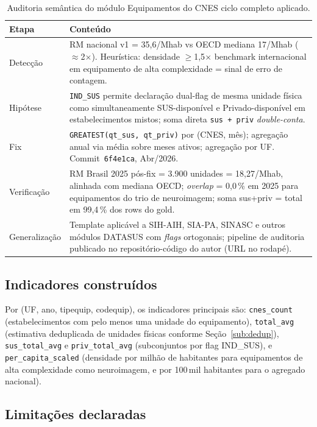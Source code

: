 \documentclass[12pt,a4paper,oneside]{article}
\begin{document}
\begin{table}[htbp]
\centering
\caption{Auditoria semântica do módulo Equipamentos do CNES \textemdash{}
ciclo completo aplicado.}
\label{tab:audit-summary}
\begin{tabular}{p{3cm} p{10cm}}
\toprule
\textbf{Etapa} & \textbf{Conteúdo} \\
\midrule
Detecção & RM nacional v1 = 35,6/Mhab vs OECD mediana 17/Mhab
($\approx$2$\times$). Heurística: densidade $\geq$1,5$\times$
benchmark internacional em equipamento de alta complexidade =
sinal de erro de contagem. \\
Hipótese & \texttt{IND\_SUS} permite declaração dual-flag de
mesma unidade física como simultaneamente SUS-disponível e
Privado-disponível em estabelecimentos mistos; soma direta
\texttt{sus + priv} \textit{double-conta}. \\
Fix & \texttt{GREATEST(qt\_sus, qt\_priv)} por (CNES, mês);
agregação anual via média sobre meses ativos; agregação por UF.
Commit~\texttt{6f4e1ca}, Abr/2026. \\
Verificação & RM Brasil 2025 pós-fix = 3.900 unidades = 18,27/Mhab,
alinhada com mediana OECD; \textit{overlap} = 0,0\,\% em 2025
para equipamentos do trio de neuroimagem; soma sus+priv = total
em 99,4\,\% dos rows do gold. \\
Generalização & Template aplicável a SIH-AIH, SIA-PA, SINASC e
outros módulos DATASUS com \textit{flags} ortogonais; pipeline
de auditoria publicado no repositório-código do autor (URL no rodapé). \\
\bottomrule
\end{tabular}
\end{table}

\subsection{Indicadores construídos}

Por (UF, ano, tipequip, codequip), os indicadores principais são:
\texttt{cnes\_count} (estabelecimentos com pelo menos uma unidade
do equipamento), \texttt{total\_avg} (estimativa deduplicada de
unidades físicas conforme Seção~\ref{sub:dedup}), \texttt{sus\_total\_avg}
e \texttt{priv\_total\_avg} (subconjuntos por flag IND\_SUS), e
\texttt{per\_capita\_scaled} (densidade por milhão de habitantes
para equipamentos de alta complexidade como neuroimagem, e por
100\,mil habitantes para o agregado nacional).

\subsection{Limitações declaradas}\label{sub:limitacoes}
\end{document}
